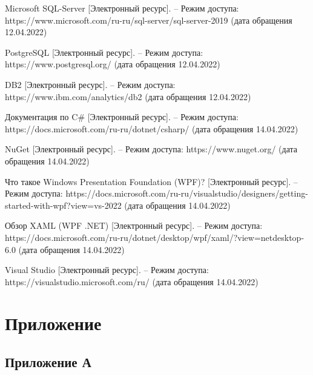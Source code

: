 \documentclass{bmstu}
\begin{document}
\begin{thebibliography}{3}
	 Microsoft SQL-Server  [Электронный ресурс]. -- Режим доступа:  https://www.microsoft.com/ru-ru/sql-server/sql-server-2019 (дата обращения 12.04.2022)
	
	 PostgreSQL [Электронный ресурс]. -- Режим доступа: https://www.postgresql.org/ (дата обращения 12.04.2022)
	
	 DB2 [Электронный ресурс]. -- Режим доступа: https://www.ibm.com/analytics/db2 (дата обращения 12.04.2022)
	
	 Документация по C\# [Электронный ресурс]. -- Режим доступа: https://docs.microsoft.com/ru-ru/dotnet/csharp/ (дата обращения 14.04.2022)
	
	 NuGet [Электронный ресурс]. -- Режим доступа: https://www.nuget.org/ (дата обращения 14.04.2022)
	
	 Что такое Windows Presentation Foundation (WPF)? [Электронный ресурс]. -- Режим доступа:  https://docs.microsoft.com/ru-ru/visualstudio/designers/getting-started-with-wpf?view=vs-2022 (дата обращения 14.04.2022)
	
	 Обзор XAML (WPF .NET) [Электронный ресурс]. -- Режим доступа:  https://docs.microsoft.com/ru-ru/dotnet/desktop/wpf/xaml/?view=netdesktop-6.0 (дата обращения 14.04.2022)
	
	 Visual Studio [Электронный ресурс]. -- Режим доступа:  https://visualstudio.microsoft.com/ru/ (дата обращения 14.04.2022)
\end{thebibliography}

\chapter*{Приложение}

\section*{Приложение А}
\end{document}
